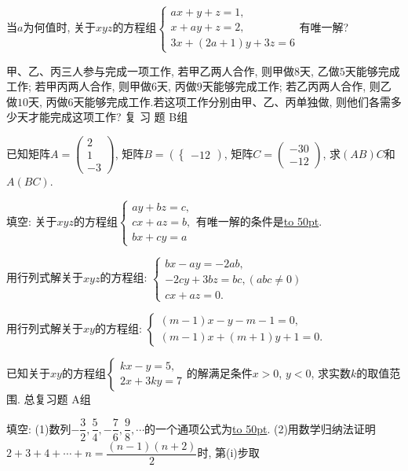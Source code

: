 \documentclass[10pt,a4paper]{article}
\newcommand{\blank}[1]{\underline{\hbox to #1pt{}}}
\begin{document}
\begin{enumerate}[1.]
{\item 当$a$为何值时, 关于$xyz$的方程组$\begin{cases}
    ax+y+z=1,  \\x+ay+z=2,  \\3x+(2a+1)y+3z=6  \end{cases}$有唯一解?
\item 甲、乙、丙三人参与完成一项工作, 若甲乙两人合作, 则甲做$8$天, 乙做$5$天能够完成工作; 若甲丙两人合作, 则甲做$6$天, 丙做$9$天能够完成工作; 若乙丙两人合作, 则乙做$10$天, 丙做$6$天能够完成工作.若这项工作分别由甲、乙、丙单独做, 则他们各需多少天才能完成这项工作?
复 习 题
B组
\item 已知矩阵$A=\begin{pmatrix}
    2  \\1  \\-3  \end{pmatrix}$, 矩阵$B=(\begin{cases}
    -1  2  \end{cases})$, 矩阵$C=\begin{pmatrix}
    -3  0  \\-1  2  \end{pmatrix}$, 求$(AB)C$和$A(BC)$.
\item 填空:
关于$xyz$的方程组$\begin{cases}
    ay+bz=c,  \\cx+az=b,  \\bx+cy=a  \end{cases}$有唯一解的条件是\blank{50}.
\item 用行列式解关于$xyz$的方程组:
$\begin{cases}
    bx-ay=-2ab,  \\-2cy+3bz=bc,(abc\ne 0)  \\cx+az=0.  \end{cases}$
\item 用行列式解关于$xy$的方程组:
$\begin{cases}
 (m-1)x-y-m-1=0,  \\(m-1)x+(m+1)y+1=0.  \end{cases}$
\item 已知关于$xy$的方程组$\begin{cases}
    kx-y=5,  \\2x+3ky=7  \end{cases}$的解满足条件$x>0$, $y<0$, 求实数$k$的取值范围.
总复习题
A组
\item 填空:
(1)数列$-\dfrac 32,\dfrac 54,-\dfrac 76,\dfrac 98,\cdots$的一个通项公式为\blank{50}.
(2)用数学归纳法证明$2+3+4+\cdots +n=\dfrac{(n-1)(n+2)}2$时, 第(i)步取
}
\end{enumerate}
\end{document}
